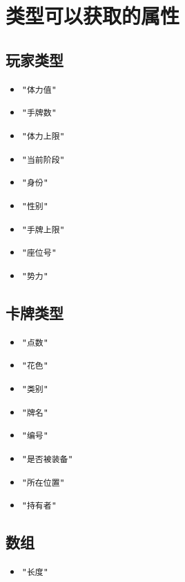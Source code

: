 \chapter{类型可以获取的属性}

\section{玩家类型}

\begin{itemize}
 \item \verb|"体力值"|
 \item \verb|"手牌数"|
 \item \verb|"体力上限"|
 \item \verb|"当前阶段"|
 \item \verb|"身份"|
 \item \verb|"性别"|
 \item \verb|"手牌上限"|
 \item \verb|"座位号"|
 \item \verb|"势力"|
\end{itemize}

\section{卡牌类型}

\begin{itemize}
 \item \verb|"点数"|
 \item \verb|"花色"|
 \item \verb|"类别"|
 \item \verb|"牌名"|
 \item \verb|"编号"|
 \item \verb|"是否被装备"|
 \item \verb|"所在位置"|
 \item \verb|"持有者"|
\end{itemize}

\section{数组}

\begin{itemize}
 \item \verb|"长度"|
\end{itemize}

